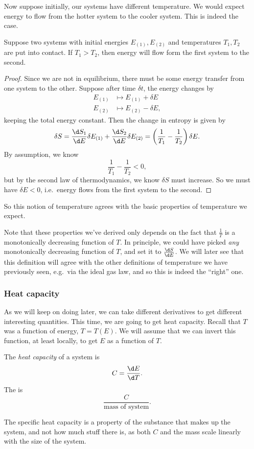 \documentclass[a4paper]{article}
\begin{document}
Now suppose initially, our systems have different temperature. We would expect energy to flow from the hotter system to the cooler system. This is indeed the case.

\begin{prop}
  Suppose two systems with initial energies $E_{(1)}, E_{(2)}$ and temperatures $T_1, T_2$ are put into contact. If $T_1 > T_2$, then energy will flow form the first system to the second.
\end{prop}

\begin{proof}
  Since we are not in equilibrium, there must be some energy transfer from one system to the other. Suppose after time $\delta t$, the energy changes by
  \begin{align*}
    E_{(1)} & \mapsto E_{(1)} + \delta E\\
    E_{(2)} & \mapsto E_{(2)} - \delta E,
  \end{align*}
  keeping the total energy constant. Then the change in entropy is given by
  \[
    \delta S = \frac{\d S_1}{\d E} \delta E_{(1)} + \frac{\d S_2}{\d E} \delta E_{(2)} = \left(\frac{1}{T_1} - \frac{1}{T_2}\right) \delta E.
  \]
  By assumption, we know
  \[
    \frac{1}{T_1} - \frac{1}{T_2} < 0,
  \]
  but by the second law of thermodynamics, we know $\delta S$ must increase. So we must have $\delta E < 0$, i.e.\ energy flows from the first system to the second.
\end{proof}
So this notion of temperature agrees with the basic properties of temperature we expect.

Note that these properties we've derived only depends on the fact that $\frac{1}{T}$ is a monotonically decreasing function of $T$. In principle, we could have picked \emph{any} monotonically decreasing function of $T$, and set it to $\frac{\d S}{\d E}$. We will later see that this definition will agree with the other definitions of temperature we have previously seen, e.g.\ via the ideal gas law, and so this is indeed the ``right'' one.

\subsubsection*{Heat capacity}
As we will keep on doing later, we can take different derivatives to get different interesting quantities. This time, we are going to get heat capacity. Recall that $T$ was a function of energy, $T = T(E)$. We will assume that we can invert this function, at least locally, to get $E$ as a function of $T$.
\begin{defi}
  The \emph{heat capacity} of a system is
  \[
    C = \frac{\d E}{\d T}.
  \]
  The  is
  \[
    \frac{C}{\text{mass of system}}.
  \]
\end{defi}
The specific heat capacity is a property of the substance that makes up the system, and not how much stuff there is, as both $C$ and the mass scale linearly with the size of the system.
\end{document}
